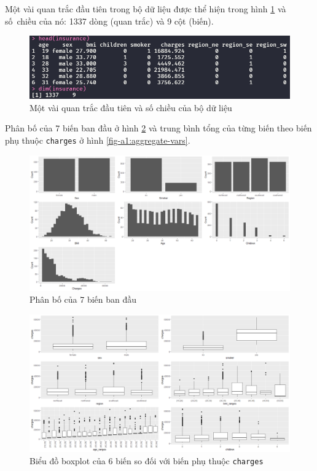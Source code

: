 Một vài quan trắc đầu tiên trong bộ dữ liệu được thể hiện trong hình \ref{fig-a1:head-dataset} và số~chiều của nó: 1337 dòng (quan trắc) và 9 cột (biến).
\begin{figure}[H]
	\centering
	\includegraphics[width=0.9\linewidth]{images/A1/head-dataset}
	\caption{Một vài quan trắc đầu tiên và số chiều của bộ dữ liệu}
	\label{fig-a1:head-dataset}
\end{figure}

Phân bố của 7 biến ban đầu ở hình \ref{fig-a1:plot-vars} và trung bình tổng của từng biến theo biến phụ thuộc \texttt{charges} ở hình \ref{fig-a1:aggregate-vars}.
\begin{figure}[H]
	\centering
	\includegraphics[width=1\linewidth]{images/A1/plot-vars}
	\caption{Phân bố của 7 biến ban đầu}
	\label{fig-a1:plot-vars}
\end{figure}

\begin{figure}[H]
	\centering
	\includegraphics[width=1\linewidth]{images/A1/boxplot-vars-by-charges}
	\caption{Biểu đồ boxplot của 6 biến so đối với biến phụ thuộc \texttt{charges}}
	\label{fig-a1:boxplot-vars}
\end{figure}

